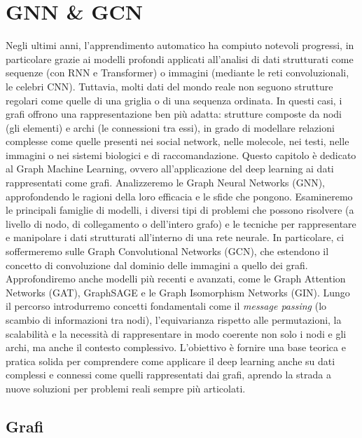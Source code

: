 \chapter{GNN \& GCN}

Negli ultimi anni, l’apprendimento automatico ha compiuto notevoli progressi, in particolare grazie ai modelli profondi applicati all’analisi di dati strutturati come sequenze (con RNN e Transformer) o immagini (mediante le reti convoluzionali, le celebri CNN). Tuttavia, molti dati del mondo reale non seguono strutture regolari come quelle di una griglia o di una sequenza ordinata. In questi casi, i grafi offrono una rappresentazione ben più adatta: strutture composte da nodi (gli elementi) e archi (le connessioni tra essi), in grado di modellare relazioni complesse come quelle presenti nei social network, nelle molecole, nei testi, nelle immagini o nei sistemi biologici e di raccomandazione. Questo capitolo è dedicato al Graph Machine Learning, ovvero all'applicazione del deep learning ai dati rappresentati come grafi. Analizzeremo le Graph Neural Networks (GNN), approfondendo le ragioni della loro efficacia e le sfide che pongono. Esamineremo le principali famiglie di modelli, i diversi tipi di problemi che possono risolvere (a livello di nodo, di collegamento o dell’intero grafo) e le tecniche per rappresentare e manipolare i dati strutturati all’interno di una rete neurale. In particolare, ci soffermeremo sulle Graph Convolutional Networks (GCN), che estendono il concetto di convoluzione dal dominio delle immagini a quello dei grafi. Approfondiremo anche modelli più recenti e avanzati, come le Graph Attention Networks (GAT), GraphSAGE e le Graph Isomorphism Networks (GIN). Lungo il percorso introdurremo concetti fondamentali come il \textit{message passing} (lo scambio di informazioni tra nodi), l’equivarianza rispetto alle permutazioni, la scalabilità e la necessità di rappresentare in modo coerente non solo i nodi e gli archi, ma anche il contesto complessivo. L’obiettivo è fornire una base teorica e pratica solida per comprendere come applicare il deep learning anche su dati complessi e connessi come quelli rappresentati dai grafi, aprendo la strada a nuove soluzioni per problemi reali sempre più articolati.

\section{Grafi}

